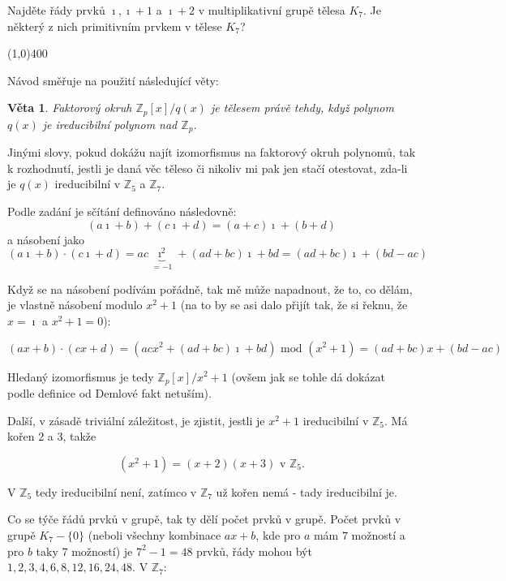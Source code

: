 \documentclass{article}
\newtheorem{veta}{Věta}[section]
\begin{document}
Najděte řády prvků $\imath, \imath + 1$ a $\imath + 2$ v multiplikativní grupě tělesa $K_7$. Je některý z nich primitivním prvkem v tělese $K_7$?

\line(1,0){400}

Návod směřuje na použití následující věty:

\begin{veta}
Faktorový okruh $\mathbb{Z}_p[x]/q(x)$ je tělesem právě tehdy, když polynom $q(x)$ je ireducibilní polynom nad $\mathbb{Z}_p$.
\end{veta}

Jinými slovy, pokud dokážu najít izomorfismus na faktorový okruh polynomů, tak k rozhodnutí, jestli je daná věc těleso či nikoliv mi pak jen stačí otestovat, zda-li je $q(x)$ ireducibilní v $\mathbb{Z}_5$ a $\mathbb{Z}_7$. 

Podle zadání je sčítání definováno následovně:
\[ (a\imath + b) + (c\imath + d) = (a + c)\imath + (b + d) \]
a násobení jako
\[(a\imath + b) \cdot (c\imath + d) = ac\underbrace{\imath^2}_{= -1} + (ad + bc)\imath + bd = (ad + bc)\imath + (bd - ac) \]

Když se na násobení podívám pořádně, tak mě může napadnout, že to, co dělám, je vlastně násobení modulo $x^2+1$ (na to by se asi dalo přijít tak, že si řeknu, že $x=\imath$ a $x^2 + 1 = 0$):

\[(ax + b) \cdot (cx + d) = (acx^2 + (ad + bc)\imath + bd)\mbox{ mod }(x^2 + 1) = (ad + bc)x + (bd - ac) \]

Hledaný izomorfismus je tedy $\mathbb{Z}_p[x]/x^2+1$ (ovšem jak se tohle dá dokázat podle definice od Demlové fakt netuším). 

Další, v zásadě triviální záležitost, je zjistit, jestli je $x^2+1$ ireducibilní v $\mathbb{Z}_5$. Má kořen 2 a 3, takže

\[ (x^2+1)=(x+2)(x+3) \mbox { v } \mathbb{Z}_5. \]
 
V $\mathbb{Z}_5$ tedy ireducibilní není, zatímco v $\mathbb{Z}_7$ už kořen nemá - tady ireducibilní je. 

Co se týče řádů prvků v grupě, tak ty dělí počet prvků v grupě. Počet prvků v grupě $K_7 - \{0\}$ (neboli všechny kombinace $ax+b$, kde pro $a$ mám $7$ možností a pro $b$ taky $7$ možností) je $7^2 - 1 = 48$ prvků, řády mohou být $1,2,3,4,6,8,12,16,24,48$. V $\mathbb{Z}_7$:
\end{document}
